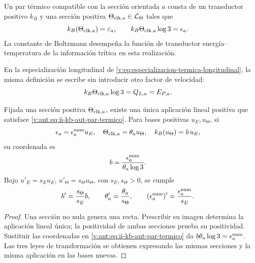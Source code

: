\begin{definition}
Un par térmico compatible con la sección orientada \(a\) consta de
un transductor positivo \(k_B\) y una sección positiva
\(\Theta_{{\rm clk},a}\in\mathcal L_\Theta\) tales que
\begin{equation}
 k_B(\Theta_{{\rm clk},a})=\varepsilon_a,
 \qquad
 k_B\Theta_{{\rm clk},a}\log3=\epsilon_a.
 \label{v:ant:eq:ii-kb-aut-par-termico}
\end{equation}
La constante de Boltzmann desempeña la función de transductor
energía--temperatura de la información trítica en esta realización.
\end{definition}

En la especialización longitudinal de
\eqref{v:eq:especializacion-termica-longitudinal}, la misma definición se
escribe sin introducir otro factor de velocidad:
\begin{equation}
 k_B\Theta_{{\rm clk},a}\log3=Q_{L,a}=E_{P,a}.
 \label{v:eq:transduccion-termica-longitudinal}
\end{equation}

\begin{theorem}
Fijada una sección positiva \(\Theta_{{\rm clk},a}\), existe una
única aplicación lineal positiva que satisface
\eqref{v:ant:eq:ii-kb-aut-par-termico}. Para bases positivas \(u_E,u_\Theta\),
si
\[
 \epsilon_a=\epsilon_a^{\rm num}u_E,\quad
 \Theta_{{\rm clk},a}=\theta_a u_\Theta,\quad
 k_B(u_\Theta)=b\,u_E,
\]
su coordenada es
\begin{equation}
 b=\frac{\epsilon_a^{\rm num}}{\theta_a\log3}.
 \label{v:ant:eq:ii-kb-aut-coordenada}
\end{equation}
Bajo \(u'_E=s_Eu_E\), \(u'_\Theta=s_\Theta u_\Theta\), con
\(s_E,s_\Theta>0\), se cumple
\[
 b'=\frac{s_\Theta}{s_E}b,\qquad
 \theta'_a=\frac{\theta_a}{s_\Theta},\qquad
 (\epsilon_a^{\rm num})'=\frac{\epsilon_a^{\rm num}}{s_E}.
\]
\end{theorem}
\begin{proof}
Una sección no nula genera una recta. Prescribir su imagen determina
la aplicación lineal única; la positividad de ambas secciones prueba
su positividad. Sustituir las coordenadas en
\eqref{v:ant:eq:ii-kb-aut-par-termico} da
\(b\theta_a\log3=\epsilon_a^{\rm num}\). Las tres leyes de
transformación se obtienen expresando las mismas secciones y la misma
aplicación en las bases nuevas.
\end{proof}

